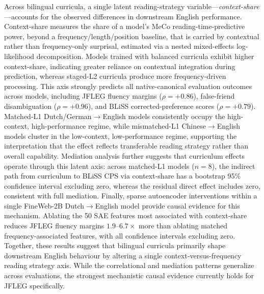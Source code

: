 \documentclass[11pt]{article}
\begin{document}
Across bilingual curricula, a single latent reading-strategy variable---\textit{context-share}---accounts for the observed differences in downstream English performance. Context-share measures the share of a model's MeCo reading-time-predictive power, beyond a frequency/length/position baseline, that is carried by contextual rather than frequency-only surprisal, estimated via a nested mixed-effects log-likelihood decomposition. Models trained with balanced curricula exhibit higher context-share, indicating greater reliance on contextual integration during prediction, whereas staged-L2 curricula produce more frequency-driven processing. This axis strongly predicts all native-canonical evaluation outcomes across models, including JFLEG fluency margins ($\rho = +0.86$), false-friend disambiguation ($\rho = +0.96$), and BLiSS corrected-preference scores ($\rho = +0.79$). Matched-L1 Dutch/German$\rightarrow$English models consistently occupy the high-context, high-performance regime, while mismatched-L1 Chinese$\rightarrow$English models cluster in the low-context, low-performance regime, supporting the interpretation that the effect reflects transferable reading strategy rather than overall capability. Mediation analysis further suggests that curriculum effects operate through this latent axis: across matched-L1 models ($n = 8$), the indirect path from curriculum to BLiSS CPS via context-share has a bootstrap 95\% confidence interval excluding zero, whereas the residual direct effect includes zero, consistent with full mediation. Finally, sparse autoencoder interventions within a single FineWeb-2B Dutch$\rightarrow$English model provide causal evidence for this mechanism. Ablating the 50 SAE features most associated with context-share reduces JFLEG fluency margins $1.9$--$6.7\times$ more than ablating matched frequency-associated features, with all confidence intervals excluding zero. Together, these results suggest that bilingual curricula primarily shape downstream English behaviour by altering a single context-versus-frequency reading strategy axis. While the correlational and mediation patterns generalize across evaluations, the strongest mechanistic causal evidence currently holds for JFLEG specifically.
\end{document}
